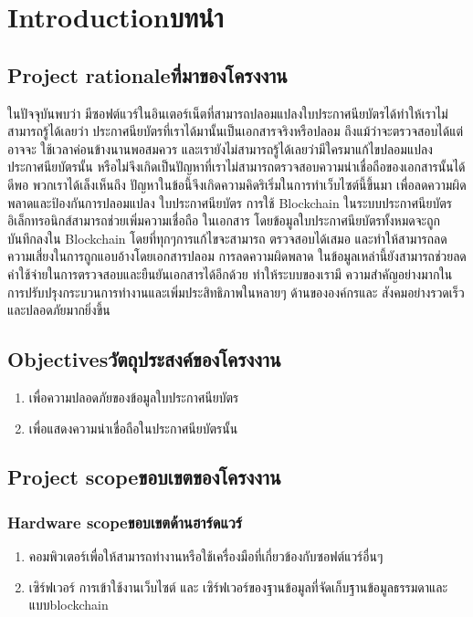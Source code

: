 \chapter{\ifenglish Introduction\else บทนำ\fi}

\section{\ifenglish Project rationale\else ที่มาของโครงงาน\fi}
\enskip \enskip \enskip \enskip \enskip 
ในปัจจุบันพบว่า มีซอฟต์แวร์ในอินเตอร์เน็ตที่สามารถปลอมแปลงใบประกาศนียบัตรได้ทำให้เราไม่
สามารถรู้ได้เลยว่า ประกาศนียบัตรที่เราได้มานั้นเป็นเอกสารจริงหรือปลอม ถึงแม้ว่าจะตรวจสอบได้แต่อาจจะ
ใช้เวลาค่อนข้างนานพอสมควร และเรายังไม่สามารถรู้ได้เลยว่ามีใครมาแก้ไขปลอมแปลงประกาศนียบัตรนั้น
หรือไม่จึงเกิดเป็นปัญหาที่เราไม่สามารถตรวจสอบความน่าเชื่อถือของเอกสารนั้นได้ดีพอ พวกเราได้เล็งเห็นถึง
ปัญหาในข้อนี้จึงเกิดความคิดริเริ่มในการทำเว็บไซต์นี้ขึ้นมา เพื่อลดความผิดพลาดและป้องกันการปลอมแปลง
ใบประกาศนียบัตร การใช้ Blockchain ในระบบประกาศนียบัตรอิเล็กทรอนิกส์สามารถช่วยเพิ่มความเชื่อถือ
ในเอกสาร โดยข้อมูลใบประกาศนียบัตรทั้งหมดจะถูกบันทึกลงใน Blockchain โดยที่ทุกๆการแก้ไขจะสามารถ
ตรวจสอบได้เสมอ และทำให้สามารถลดความเสี่ยงในการถูกแอบอ้างโดยเอกสารปลอม การลดความผิดพลาด
ในข้อมูลเหล่านี้ยังสามารถช่วยลดค่าใช้จ่ายในการตรวจสอบและยืนยันเอกสารได้อีกด้วย ทำให้ระบบของเรามี
ความสำคัญอย่างมากในการปรับปรุงกระบวนการทำงานและเพิ่มประสิทธิภาพในหลายๆ ด้านขององค์กรและ
สังคมอย่างรวดเร็วและปลอดภัยมากยิ่งขึ้น




\section{\ifenglish Objectives\else วัตถุประสงค์ของโครงงาน\fi}
\begin{enumerate}
    \item เพื่อความปลอดภัยของข้อมูลใบประกาศนียบัตร
    \item เพื่อแสดงความน่าเชื่อถือในประกาศนียบัตรนั้น
\end{enumerate}

\section{\ifenglish Project scope\else ขอบเขตของโครงงาน\fi}

\subsection{\ifenglish Hardware scope\else ขอบเขตด้านฮาร์ดแวร์\fi}
\begin{enumerate}
    \item คอมพิวเตอร์เพื่อให้สามารถทํางานหรือใช้เครื่องมือที่เกี่ยวข้องกับซอฟต์แวร์อื่นๆ
    \item เซิร์ฟเวอร์ การเข้าใช้งานเว็บไซต์ และ เซิร์ฟเวอร์ของฐานข้อมูลที่จัดเก็บฐานข้อมูลธรรมดาและแบบblockchain
\end{enumerate}
